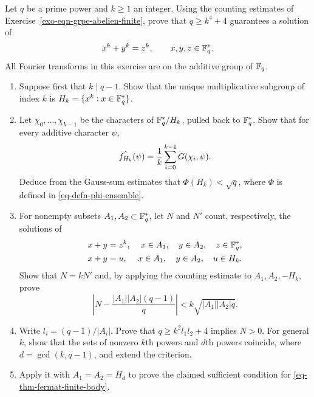 \begin{exo}
\label{exo-thm-fermat-finite-body}
Let $q$ be a prime power and $k\geq1$ an integer. Using the counting estimates
of Exercise~\ref{exo-eqn-grpe-abelien-finite}, prove that $q\geq k^4+4$
guarantees a solution of
\begin{equation}
\label{eq-thm-fermat-finite-body}
 x^k+y^k=z^k,\qquad x,y,z\in\mathbb{F}_q^*.
\end{equation}
All Fourier transforms in this exercise are on the additive group of $\mathbb{F}_q$.
\begin{enumerate}
\item Suppose first that $k\mid q-1$. Show that the unique multiplicative
subgroup of index $k$ is $H_k=\{x^k:x\in\mathbb{F}_q^*\}$.
\item Let $\chi_0,\ldots,\chi_{k-1}$ be the characters of
$\mathbb{F}_q^*/H_k$, pulled back to $\mathbb{F}_q^*$. Show that for every additive
character $\psi$,
\[
 \hat{f_{H_k}}(\psi)=\frac1k\sum_{i=0}^{k-1}G(\chi_i,\psi).
\]
Deduce from the Gauss-sum estimates that $\Phi(H_k)<\sqrt q$, where
$\Phi$ is defined in \eqref{eq-defn-phi-ensemble}.
\item For nonempty subsets $A_1,A_2\subset\mathbb{F}_q^*$, let $N$ and $N'$
count, respectively, the solutions of
\begin{align}
\label{eq-thm-fermat_intermediaire}
 x+y&=z^k,& x\in A_1,\quad y\in A_2,\quad z\in\mathbb{F}_q^*,\\
 x+y&=u,& x\in A_1,\quad y\in A_2,\quad u\in H_k.\nonumber
\end{align}
Show that $N=kN'$ and, by applying the counting estimate to
$A_1,A_2,-H_k$, prove
\begin{equation}
\label{eqn-fermat-majoration}
 \left|N-\frac{|A_1||A_2|(q-1)}q\right|
       <k\sqrt{|A_1||A_2|q}.
\end{equation}
\item Write $l_i=(q-1)/|A_i|$. Prove that $q\geq k^2l_1l_2+4$ implies
$N>0$. For general $k$, show that the sets of nonzero $k$th powers and
$d$th powers coincide, where $d=\gcd(k,q-1)$, and extend the criterion.
\item Apply it with $A_1=A_2=H_d$ to prove the claimed sufficient condition
for \eqref{eq-thm-fermat-finite-body}.
\end{enumerate}
\end{exo}


